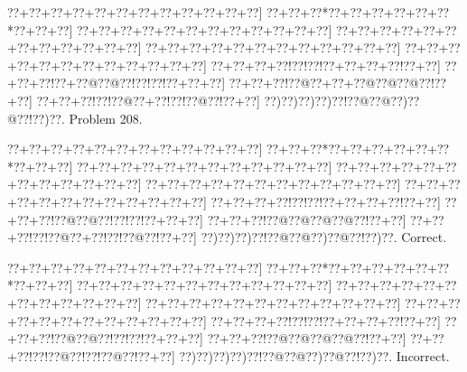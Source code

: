 \documentclass[a5paper]{article}
\begin{document}
\begin{center}
{\goo
\0??+\0??+\0??+\0??+\0??+\0??+\0??+\0??+\0??+\0??+\0??+\0??]
\0??+\0??+\0??*\0??+\0??+\0??+\0??+\0??+\0??*\0??+\0??+\0??]
\0??+\0??+\0??+\0??+\0??+\0??+\0??+\0??+\0??+\0??+\0??+\0??]
\0??+\0??+\0??+\0??+\0??+\0??+\0??+\0??+\0??+\0??+\0??+\0??]
\0??+\0??+\0??+\0??+\0??+\0??+\0??+\0??+\0??+\0??+\0??+\0??]
\0??+\0??+\0??+\0??+\0??+\0??+\0??+\0??+\0??+\0??+\0??+\0??]
\0??+\0??+\0??+\0??!\0??!\0??!\0??+\0??+\0??+\0??!\0??+\0??]
\0??+\0??+\0??!\0??+\0??@\0??@\0??!\0??!\0??!\0??+\0??+\0??]
\0??+\0??+\0??!\0??@\0??+\0??+\0??@\0??@\0??@\0??!\0??+\0??]
\0??+\0??+\0??!\0??!\0??@\0??+\0??!\0??!\0??@\0??!\0??+\0??]
\0??)\0??)\0??)\0??)\0??!\0??@\0??@\0??)\0??@\0??!\0??)\0??.
}
Problem 208.

\end{center}
\begin{center}
{\goo
\0??+\0??+\0??+\0??+\0??+\0??+\0??+\0??+\0??+\0??+\0??+\0??]
\0??+\0??+\0??*\0??+\0??+\0??+\0??+\0??+\0??*\0??+\0??+\0??]
\0??+\0??+\0??+\0??+\0??+\0??+\0??+\0??+\0??+\0??+\0??+\0??]
\0??+\0??+\0??+\0??+\0??+\0??+\0??+\0??+\0??+\0??+\0??+\0??]
\0??+\0??+\0??+\0??+\0??+\0??+\0??+\0??+\0??+\0??+\0??+\0??]
\0??+\0??+\0??+\0??+\0??+\0??+\0??+\0??+\0??+\0??+\0??+\0??]
\0??+\0??+\0??+\0??!\0??!\0??!\0??+\0??+\0??+\0??!\0??+\0??]
\0??+\0??+\0??!\0??@\0??@\0??!\0??!\0??!\0??+\0??+\0??]
\0??+\0??+\0??!\0??@\0??@\0??@\0??@\0??!\0??+\0??]
\0??+\0??+\0??!\0??!\0??@\0??+\0??!\0??!\0??@\0??!\0??+\0??]
\0??)\0??)\0??)\0??!\0??@\0??@\0??)\0??@\0??!\0??)\0??.
}
Correct. 

\end{center}
\begin{center}
{\goo
\0??+\0??+\0??+\0??+\0??+\0??+\0??+\0??+\0??+\0??+\0??+\0??]
\0??+\0??+\0??*\0??+\0??+\0??+\0??+\0??+\0??*\0??+\0??+\0??]
\0??+\0??+\0??+\0??+\0??+\0??+\0??+\0??+\0??+\0??+\0??+\0??]
\0??+\0??+\0??+\0??+\0??+\0??+\0??+\0??+\0??+\0??+\0??+\0??]
\0??+\0??+\0??+\0??+\0??+\0??+\0??+\0??+\0??+\0??+\0??+\0??]
\0??+\0??+\0??+\0??+\0??+\0??+\0??+\0??+\0??+\0??+\0??+\0??]
\0??+\0??+\0??+\0??!\0??!\0??!\0??+\0??+\0??+\0??!\0??+\0??]
\0??+\0??+\0??!\0??@\0??@\0??!\0??!\0??!\0??+\0??+\0??]
\0??+\0??+\0??!\0??@\0??@\0??@\0??@\0??!\0??+\0??]
\0??+\0??+\0??!\0??!\0??@\0??!\0??!\0??@\0??!\0??+\0??]
\0??)\0??)\0??)\0??)\0??!\0??@\0??@\0??)\0??@\0??!\0??)\0??.
}
Incorrect. 

\end{center}
\newpage
\end{document}

